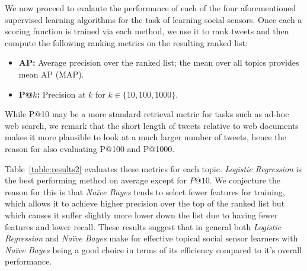 We now proceed to evalaute the performance of each of the four
aforementioned supervised learning algorithms for the task of
learning social sensors.  Once each a scoring function is trained
via each method, we use it to rank tweets and then compute the
following ranking metrics on the resulting ranked list:
\begin{itemize}
\item {\bf AP:} Average precision over the ranked list; the mean over
all topics provides mean AP (MAP).
\item {\bf P@$k$:} Precision at $k$ for $k \in \{ 10, 100, 1000 \}$.
\end{itemize}
While P@10 may be a more standard retrieval metric for tasks such
as ad-hoc web search, we remark that the short length of tweets relative
to web documents makes it more plausible to look at a much larger number
of tweets, hence the reason for also evaluating P@100 and P@1000.

%
Table~\ref{table:results2} evaluates these metrics for each
topic. \textit{Logistic Regression} is the best performing
method on average except for $P@10$.  We conjecture the reason
for this is that \textit{Na\"{i}ve Bayes} tends to select fewer
features for training, which allows it to achieve higher precision
over the top of the ranked list but which causes it suffer slightly
more lower down the list due to having fewer features and lower recall.
These results suggest that in general both \textit{Logistic Regression}
and \textit{Na\"{i}ve Bayes} make for effective topical social sensor
learners with \textit{Na\"{i}ve Bayes} being a good choice in terms
of its efficiency compared to it's overall performance.

